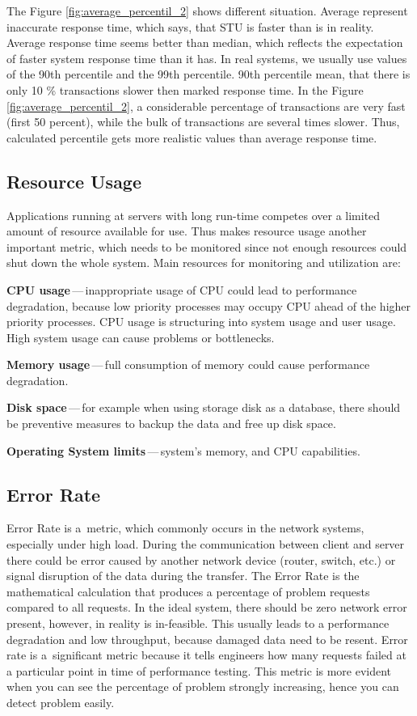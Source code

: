 The Figure \ref{fig:average_percentil_2} shows different situation. Average represent inaccurate response time, which says, that STU is faster than is in reality. Average response time seems better than median, which reflects the expectation of faster system response time than it has. In real systems, we usually use values of the 90th percentile and the 99th percentile. 90th percentile mean, that there is only 10 \% transactions slower then marked response time. In the Figure \ref{fig:average_percentil_2}, a considerable percentage of transactions are very fast (first 50 percent), while the bulk of transactions are several times slower. Thus, calculated percentile gets more realistic values than average response time.

\subsection{Resource Usage}
Applications running at servers with long run-time competes over a limited amount of resource available for use. Thus makes resource usage another important metric, which needs to be monitored since not enough resources could shut down the whole system. Main resources for monitoring and utilization are:

\begin{description}
	\setlength\itemsep{0em}
	\item \textbf{CPU usage}\,---\,inappropriate usage of CPU could lead to performance degradation, because low priority processes may occupy CPU ahead of the higher priority processes. CPU usage is structuring into system usage and user usage. High system usage can cause problems or bottlenecks.
	\item \textbf{Memory usage}\,---\,full consumption of memory could cause performance degradation.
	\item \textbf{Disk space}\,---\,for example when using storage disk as a database, there should be preventive measures to backup the data and free up disk space.
	\item \textbf{Operating System limits}\,---\,system's memory, and CPU capabilities. 
\end{description}


\subsection{Error Rate}
Error Rate is a~metric, which commonly occurs in the network systems, especially under high load. During the communication between client and server there could be error caused by another network device (router, switch, etc.) or signal disruption of the data during the transfer. The Error Rate is the mathematical calculation that produces a percentage of problem requests compared to all requests. In the ideal system, there should be zero network error present, however, in reality is in-feasible. This usually leads to a performance degradation and low throughput, because damaged data need to be resent.
Error rate is a~significant metric because it tells engineers how many requests failed at a particular point in time of performance testing. This metric is more evident when you can see the percentage of problem strongly increasing, hence you can detect problem easily.


